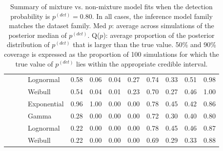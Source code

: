 \documentclass[useAMS,usenatbib,referee,12pt]{article}
\newcommand{\pdet}{p^{(det)}}
\begin{document}
\begin{table}[ht]
\begin{tabular}{l|l|l|l|cccc|cccc}
   &  &  & Lognormal & 0.58 & 0.06 & 0.04 & 0.27 & 0.74 & 0.33 & 0.51 & 0.98 \\ 
   &  &  & Weibull & 0.54 & 0.04 & 0.01 & 0.23 & 0.70 & 0.27 & 0.46 & 1.00 \\ 
  \cline{3-12}
   &  &  & Exponential & 0.96 & 1.00 & 0.00 & 0.00 & 0.78 & 0.45 & 0.42 & 0.86 \\ 
  \cline{3-12}
 & & \parbox[t]{2mm}{} & Gamma & 0.28 & 0.00 & 0.00 & 0.00 & 0.72 & 0.30 & 0.40 & 0.80 \\ 
   &  &  & Lognormal & 0.22 & 0.00 & 0.00 & 0.00 & 0.78 & 0.45 & 0.46 & 0.87 \\ 
   &  &  & Weibull & 0.22 & 0.00 & 0.00 & 0.00 & 0.69 & 0.29 & 0.33 & 0.88 \\ 
   \hline
\end{tabular}
\caption{Summary of mixture vs. non-mixture model fits when the detection probability is $\pdet =0.80$.  
In all cases, the inference model family matches the dataset family.  
Med $p$: average across simulations of the posterior median of $\pdet$.  
Q($p$): average proportion of the posterior distribution of $\pdet$ that is larger than the true value.  
50\% and 90\% coverage is expressed as the proportion of 100 simulations for which the true value of $\pdet$ lies within the appropriate credible interval.}
\label{tbl:mix80}

\vspace{1.2cm}


\end{table}
\end{document}
